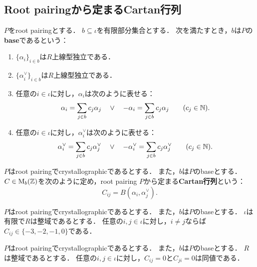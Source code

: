 \subsection{Root pairingから定まるCartan行列} \label{sec:Cartan_defined_by_RootPairing}

\begin{definition}
  \label{def:RootPairing.Base}
  \leanok
  $P$をroot pairingとする．
  $b \subseteq \iota$を有限部分集合とする．
  次を満たすとき，$b$は$P$の\textbf{base}であるという：
\begin{enumerate}[label=(\roman*)]
  \item $\{\alpha_i\}_{i \in b}$は$R$上線型独立である．
  \item $\{\alpha^\vee_i\}_{i \in b}$は$R$上線型独立である．
  \item 任意の$i \in \iota$に対し，$\alpha_i$は次のように表せる：
  \begin{equation}
    \alpha_i = \sum_{j \in b} c_j \alpha_j \quad \lor \quad
    -\alpha_i = \sum_{j \in b} c_j \alpha_j \qquad (c_j \in \mathbb{N}).
  \end{equation}
  \item 任意の$i \in \iota$に対し，$\alpha^\vee_i$は次のように表せる：
  \begin{equation}
    \alpha^\vee_i = \sum_{j \in b} c_j \alpha^\vee_j \quad \lor \quad
    -\alpha^\vee_i = \sum_{j \in b} c_j \alpha^\vee_j \qquad (c_j \in \mathbb{N}).
  \end{equation}
\end{enumerate}
\end{definition}

\begin{definition}
  \label{def:RootPairing.Base.cartanMatrix}
  \leanok
  $P$はroot pairingでcrystallographicであるとする．
  また，$b$は$P$のbaseとする．
  $C \in \operatorname{M}_b(\mathbb{Z})$を次のように定め，root pairing $P$から定まる\textbf{Cartan行列}という：
  \begin{equation}
    C_{ij} = B(\alpha_i, \alpha^\vee_j).
  \end{equation}
\end{definition}

\begin{lemma}
  \label{lem:RootPairing.Base.cartanMatrix_mem_of_ne}
  \leanok
  $P$はroot pairingでcrystallographicであるとする．
  また，$b$は$P$のbaseとする．
  $\iota$は有限で$R$は整域であるとする．
  任意の$i, j \in \iota$に対し，$i \ne j$ならば$C_{ij} \in \{-3, -2, -1, 0\}$である．
\end{lemma}

\begin{lemma}
  \label{lem:RootPairing.Base.cartanMatrix_apply_eq_zero_iff_symm}
  \leanok
  \uses{}
  $P$はroot pairingでcrystallographicであるとする．
  また，$b$は$P$のbaseとする．
  $R$は整域であるとする．
  任意の$i, j \in \iota$に対し，$C_{ij} = 0$と$C_{ji} = 0$は同値である．
\end{lemma}